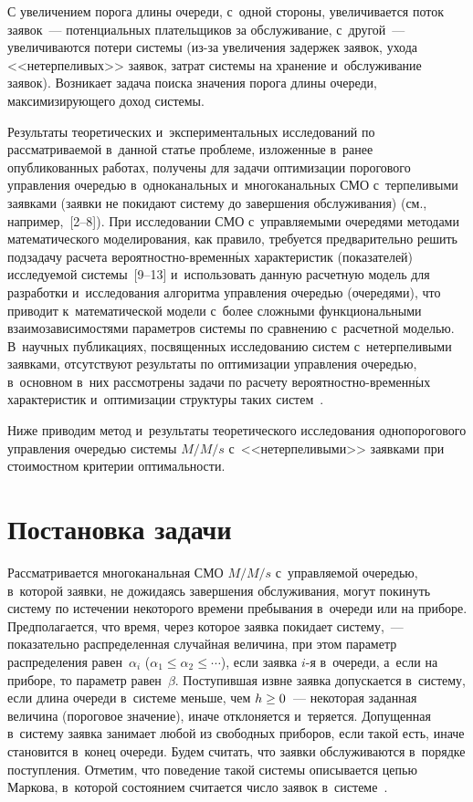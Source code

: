 \begin{multicols}{2}
  С увеличением порога длины очереди, с~одной стороны, увеличивается поток 
заявок~--- потенциальных плательщиков за обслуживание, с~другой~--- 
увеличиваются потери сис\-те\-мы (из-за увеличения задержек заявок, ухода 
<<нетерпеливых>> заявок, затрат сис\-те\-мы на хранение и~обслуживание 
заявок). Возникает задача поиска значения порога длины очереди, 
максимизирующего доход сис\-темы.
  
  Результаты теоретических и~экспериментальных исследований по 
рассматриваемой в~данной \mbox{статье} проб\-ле\-ме, изложенные в~ранее 
опубликованных работах, получены для задачи оптимизации порогового 
управления очередью в~одноканальных и~многоканальных СМО с~терпеливыми 
заявками (заявки не покидают сис\-те\-му до завершения обслуживания) (см., 
например,~[2--8]). При исследовании СМО с~управ\-ля\-емы\-ми очередями 
методами математического моделирования, как правило, требуется 
предварительно решить подзадачу расчета  
ве\-ро\-ят\-ност\-но-вре\-мен\-н$\acute{\mbox{ы}}$х характеристик (показателей) исследуемой  
сис\-те\-мы~[9--13] и~использовать данную расчетную модель для разработки 
и~исследования алгоритма управ\-ле\-ния очередью (очередями), что приводит 
к~математической модели с~более сложными функциональными 
взаимозависимостями параметров системы по сравнению с~расчетной моделью. 
В~научных пуб\-ли\-ка\-ци\-ях, посвященных исследованию сис\-тем 
с~нетерпеливыми заявками, отсутствуют результаты по оптимизации  
управ\-ле\-ния очередью, в~основном в~них рас\-смот\-ре\-ны задачи по расчету  
ве\-ро\-ят\-ност\-но-вре\-мен\-н$\acute{\mbox{ы}}$х характеристик и~оптимизации структуры таких 
сис\-тем~\cite{9-ag, 10-ag}.
  
  Ниже приводим метод и~результаты теоретического исследования 
однопорогового управления очередью системы $M/M/s$ с~<<нетерпеливыми>> 
заявками при стоимостном критерии оптимальности. 
  
\section{Постановка задачи }

  Рассматривается многоканальная СМО $M/M/s$ с~управляемой очередью, 
в~которой заявки, не дожидаясь завершения обслуживания, могут покинуть 
систему по истечении некоторого времени пребывания в~очереди или на приборе. 
Предполагается, что время, через которое заявка покидает сис\-те\-му,~--- 
показательно распределенная случайная величина, при этом параметр 
распределения равен~$\alpha_i$ ($\alpha_1\leq \alpha_2\leq\cdots$), если заявка  
\mbox{$i$-я} в~очереди, а~если на приборе, то параметр равен~$\beta$. 
Поступившая извне заявка допускается в~систему, если длина очереди в~системе 
меньше, чем $h\hm\geq 0$~--- некоторая заданная величина (пороговое значение), 
иначе отклоняется и~теряется. Допущенная в~систему заявка занимает любой из 
свободных приборов, если такой есть, иначе становится в~конец очереди. Будем 
считать, что заявки обслуживаются в~порядке поступления. Отметим, что 
поведение такой сис\-те\-мы описывается цепью Маркова, в~которой 
состоянием считается число заявок в~системе~\cite{9-ag}.
  

\end{multicols}
